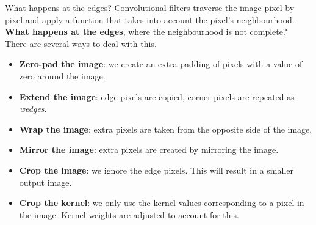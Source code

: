 \documentclass[9pt, aspectratio=169]{beamer}
\begin{document}
\begin{frame}
    {What happens at the edges?}
    Convolutional filters traverse the image pixel by pixel and apply a function that takes into account the pixel's neighbourhood.\\

    \textbf{What happens at the edges}, where the neighbourhood is not complete?\\

    There are several ways to deal with this.
    \pause
    \footnotesize{
        \begin{itemize}
            \item<2->\textbf{Zero-pad the image}: we create an extra padding of pixels with a value of zero around the image.
            \item<3-> \textbf{Extend the image}: edge pixels are copied, corner pixels are repeated as \textit{wedges}.
            \item<4-> \textbf{Wrap the image}: extra pixels are taken from the opposite side of the image.
            \item<5-> \textbf{Mirror the image}: extra pixels are created by mirroring the image.
            \item<6-> \textbf{Crop the image}: we ignore the edge pixels. This will result in a smaller output image.
            \item<6-> \textbf{Crop the kernel}: we only use the kernel values corresponding to a pixel in the image. Kernel weights are adjusted to account for this.
        \end{itemize}
    }
\end{frame}
\end{document}

